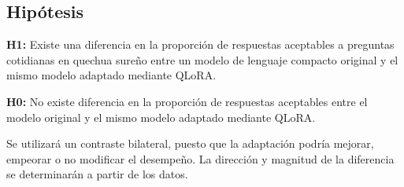 \subsection{Hipótesis}\label{hipuxf3tesis}

\textbf{H1:} Existe una diferencia en la proporción de respuestas aceptables a preguntas cotidianas en quechua sureño entre un modelo de lenguaje compacto original y el mismo modelo adaptado mediante QLoRA.

\textbf{H0:} No existe diferencia en la proporción de respuestas aceptables entre el modelo original y el mismo modelo adaptado mediante QLoRA.

Se utilizará un contraste bilateral, puesto que la adaptación podría mejorar, empeorar o no modificar el desempeño. La dirección y magnitud de la diferencia se determinarán a partir de los datos.
